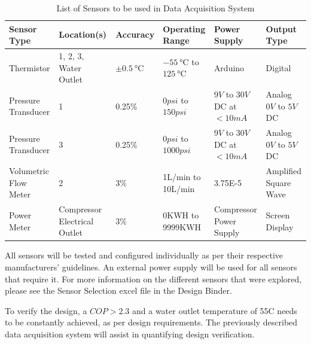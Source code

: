 \medskip
\begin{table}[H]
\centering
\caption{List of Sensors to be used in Data Acquisition System}
\begin{tabular}{|P{26mm}|P{26mm}|P{15mm}|P{27mm}|P{23mm}|P{20mm}|}
    \hline
    Sensor Type & Location(s) & Accuracy & Operating Range & Power Supply & Output Type \\
    \hline
    Thermistor \cite{thermometer}            & 1, 2, 3, Water Outlet        & $\pm \SI{0.5}{\celsius}$ & $\SI{-55}{\celsius}$ to $\SI{125}{\celsius}$ & Arduino  & Digital \\
    Pressure Transducer \cite{pressure_transducer1}   & 1                            & 0.25\%                   & $0psi$ to $150psi$ & $9V$ to $30V$ DC at $<10mA$ & Analog $0V$ to $5V$ DC \\
    Pressure Transducer \cite{pressure_transducer1}   & 3                            & 0.25\%                   & $0psi$ to $1000psi$ & $9V$ to $30V$ DC at $<10mA$ & Analog $0V$ to $5V$ DC \\
    Volumetric Flow Meter \cite{pressure_transducer2} & 2                            & 3\%                      & 1L/min to 10L/min & 3.75E-5 & Amplified Square Wave \\
    Power Meter \cite{power_meter}           & Compressor Electrical Outlet & 3\%                      & 0KWH to 9999KWH & Compressor Power Supply  & Screen Display \\
    \hline
\end{tabular}
\end{table}

\medskip
All sensors will be tested and configured individually as per their respective manufacturers’ guidelines. An external power supply will be used for all sensors that require it. For more information on the different sensors that were explored, please see the Sensor Selection excel file in the Design Binder.

\medskip
To verify the design, a $COP > 2.3$ and a water outlet temperature of 55\textdegree C needs to be constantly achieved, as per design requirements. The previously described data acquisition system will assist in quantifying design verification.
